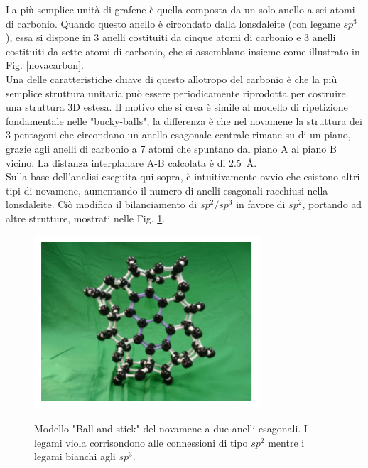 \documentclass[a4paper,titlepage]{book}
\begin{document}
La più semplice unità di grafene è quella composta da un solo anello a sei atomi di carbonio. Quando questo anello è circondato dalla lonsdaleite (con legame $sp^3$), essa si dispone in 3 anelli costituiti da cinque atomi di carbonio e 3 anelli costituiti da sette atomi di carbonio, che si assemblano insieme come illustrato in Fig. \ref{novacarbon}. \\
Una delle caratteristiche chiave di questo allotropo del carbonio è che la più semplice struttura unitaria può essere periodicamente riprodotta per costruire una struttura 3D estesa. Il motivo che si crea è simile al modello di ripetizione fondamentale nelle "bucky-balls"; la differenza è che nel novamene la struttura dei 3 pentagoni che circondano un anello esagonale centrale rimane su di un piano, grazie agli anelli di carbonio a 7 atomi che spuntano dal piano A al piano B vicino. La distanza interplanare A-B calcolata è di \SI{2,5}{\angstrom}.\\

Sulla base dell'analisi eseguita qui sopra, è intuitivamente ovvio che esistono altri tipi di novamene, aumentando il numero di anelli esagonali racchiusi nella lonsdaleite. Ciò modifica il bilanciamento di $sp^2/sp^3$ in favore di $sp^2$, portando ad altre strutture, mostrati nelle Fig. \ref{twonovah}.
\begin{figure}[h!] 
	\centering \label{twonovah}
	\includegraphics[width=0.55\columnwidth]{twonovamene.png}
	\caption{  Modello "Ball-and-stick" del novamene a due anelli esagonali. I legami viola corrisondono alle connessioni di tipo $sp^2$ mentre i legami bianchi agli $sp^3$.
	}
\end{figure}
\end{document}
